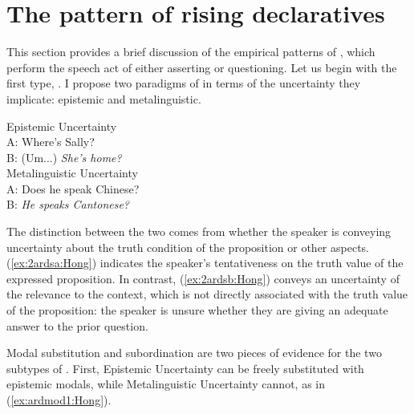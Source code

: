 \documentclass[output=paper,colorlinks,citecolor=brown]{langscibook}
\begin{document}
\section{The pattern of rising declaratives}
\label{sec:phen:Hong}

This section provides a brief discussion of the empirical patterns of , which perform the speech act of either asserting or questioning. Let us begin with the first type, . I propose two paradigms of  in terms of the uncertainty they implicate: epistemic and metalinguistic. 

\ea \label{ex:2ards:Hong}
    \ea \label{ex:2ardsa:Hong} Epistemic Uncertainty \\
    A: Where's Sally?\\
    B: (Um...) \textit{She's home?}\\
    \ex \label{ex:2ardsb:Hong} Metalinguistic Uncertainty \\
    A: Does he speak Chinese?\\
    B: \textit{He speaks Cantonese?}\\
    \z
\z

\noindent The distinction between the two comes from whether the speaker is conveying uncertainty about the truth condition of the proposition or other aspects. (\ref{ex:2ardsa:Hong}) indicates the speaker’s tentativeness on the truth value of the expressed proposition. In contrast, (\ref{ex:2ardsb:Hong}) conveys an uncertainty of the relevance to the context, which is not directly associated with the truth value of the proposition: the speaker is unsure whether they are giving an adequate answer to the prior question.

Modal substitution and subordination are two pieces of evidence for the two subtypes of . First, Epistemic Uncertainty  can be freely substituted with epistemic modals, while Metalinguistic Uncertainty  cannot, as in (\ref{ex:ardmod1:Hong}).

\end{document}
